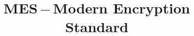%
%
%
%
%
%
\RequirePackage{fix-cm}
%
\documentclass{svjour3}                     %
%
\smartqed  %

\usepackage{graphicx}
\usepackage{ragged2e}

\usepackage{mathptmx}      %
\usepackage{amsfonts}
\usepackage{amsmath}
\usepackage{amssymb}
\usepackage{cite}
\usepackage[section]{placeins}
\usepackage{multirow}
\usepackage{bigstrut}

\usepackage{caption}
\captionsetup{justification=centering}
%
%
%
%


\notag
\sloppy
{}
\title{MES\,$-$\,Modern Encryption Standard%
}

